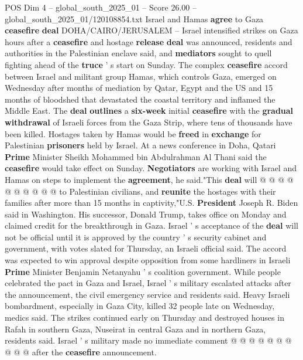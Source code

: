 \begin{textsample}{POS Dim 4 – global\_south\_2025\_01 – Score 26.00 – global\_south\_2025\_01/120108854.txt}  \label{ex:f4_pos_011}
Israel and Hamas \textbf{agree} to Gaza \textbf{ceasefire} \textbf{deal} DOHA/CAIRO/JERUSALEM -- Israel intensified strikes on Gaza hours after a \textbf{ceasefire} and hostage \textbf{release} \textbf{deal} was announced, residents and authorities in the Palestinian enclave said, and \textbf{mediators} sought to quell fighting ahead of the \textbf{truce} ' s start on Sunday.
The complex \textbf{ceasefire} accord between Israel and militant group Hamas, which controls Gaza, emerged on Wednesday after months of mediation by Qatar, Egypt and the US and 15 months of bloodshed that devastated the coastal territory and inflamed the Middle East.
The \textbf{deal} \textbf{outlines} a \textbf{six-week} initial \textbf{ceasefire} with the \textbf{gradual} \textbf{withdrawal} of Israeli forces from the Gaza Strip, where tens of thousands have been killed.
Hostages taken by Hamas would be \textbf{freed} in \textbf{exchange} for Palestinian \textbf{prisoners} held by Israel.
At a news conference in Doha, Qatari \textbf{Prime} Minister Sheikh Mohammed bin Abdulrahman Al Thani said the \textbf{ceasefire} would take effect on Sunday. \textbf{Negotiators} are working with Israel and Hamas on steps to implement the \textbf{agreement}, he said."This \textbf{deal} will @ @ @ @ @ @ @ @ @ @ to Palestinian civilians, and \textbf{reunite} the hostages with their families after more than 15 months in captivity,"U.S. \textbf{President} Joseph R.
Biden said in Washington.
His successor, Donald Trump, takes office on Monday and claimed credit for the breakthrough in Gaza.
Israel ' s acceptance of the \textbf{deal} will not be official until it is approved by the country ' s security cabinet and government, with votes slated for Thursday, an Israeli official said.
The accord was expected to win approval despite opposition from some hardliners in Israeli \textbf{Prime} Minister Benjamin Netanyahu ' s coalition government.
While people celebrated the pact in Gaza and Israel, Israel ' s military escalated attacks after the announcement, the civil emergency service and residents said.
Heavy Israeli bombardment, especially in Gaza City, killed 32 people late on Wednesday, medics said.
The strikes continued early on Thursday and destroyed houses in Rafah in southern Gaza, Nuseirat in central Gaza and in northern Gaza, residents said.
Israel ' s military made no immediate comment @ @ @ @ @ @ @ @ @ @ after the \textbf{ceasefire} announcement.

\end{textsample}
